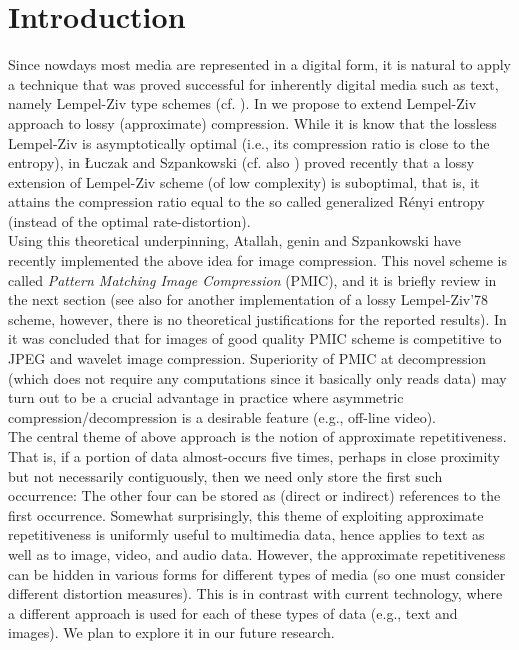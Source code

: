 \documentclass[11pt,a4paper]{article}
\begin{document}
\begin{htmlonly}
  \centerline{}
\end{htmlonly}

\newpage

\section{Introduction}

Since nowdays most media are represented in a digital form, it is natural
to apply a technique that was proved successful for inherently digital
media such as text, namely Lempel-Ziv type schemes (cf. \cite{zl1,zl2}).
In \cite{lus1,lus2} we propose to extend Lempel-Ziv approach to lossy
(approximate) compression. While it is know that the lossless Lempel-Ziv is
asymptotically optimal (i.e., its compression ratio is close to the
entropy), in \cite{lus2} \L uczak and Szpankowski (cf. also \cite{yk})
proved recently that a lossy extension of Lempel-Ziv scheme (of low
complexity) is suboptimal, that is, it attains the compression ratio equal
to the so called generalized R\'{e}nyi entropy (instead of the optimal
rate-distortion).\\

Using this theoretical underpinning, Atallah, genin and Szpankowski
\cite{ags} have recently implemented the above idea for image compression.
This novel scheme is called {\it Pattern Matching Image Compression}
(PMIC), and it is briefly review in the next section (see also \cite{cs}
for another implementation of a lossy Lempel-Ziv'78 scheme, however, there
is no theoretical justifications for the reported results).  In \cite{ags}
it was concluded that for images of good quality PMIC scheme is competitive
to JPEG and wavelet image compression.  Superiority of PMIC at
decompression (which does not require any computations since it basically
only reads data) may turn out to be a crucial advantage in practice where
asymmetric compression/decompression is a desirable feature (e.g., off-line
video).\\

The central theme of above approach is the notion of approximate
repetitiveness.  That is, if a portion of data almost-occurs five times,
perhaps in close proximity but not necessarily contiguously, then we need
only store the first such occurrence: The other four can be stored as
(direct or indirect) references to the first occurrence.  Somewhat
surprisingly, this theme of exploiting approximate repetitiveness is
uniformly useful to multimedia data, hence applies to text as well as to
image, video, and audio data.  However, the approximate repetitiveness can
be hidden in various forms for different types of media (so one must
consider different distortion measures).  This is in contrast with current
technology, where a different approach is used for each of these types of
data (e.g., text and images).  We plan to explore it in our future
research.\\
\end{document}

